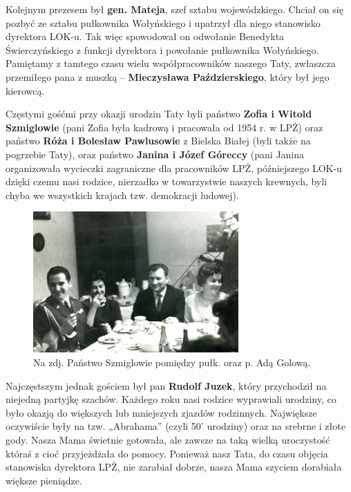 Kolejnym prezesem był \textbf{gen. Mateja}, szef sztabu wojewódzkiego. Chciał on się pozbyć ze sztabu pułkownika Wołyńskiego i upatrzył dla niego stanowisko dyrektora LOK-u. Tak więc spowodował on odwołanie Benedykta Świerczyńskiego z funkcji dyrektora i powołanie pułkownika Wołyńskiego. Pamiętamy z tamtego czasu wielu współpracowników naszego Taty, zwłaszcza przemiłego pana z muszką – \textbf{Mieczysława Paździerskiego}, który był jego kierowcą.

Częstymi gośćmi przy okazji urodzin Taty byli państwo \textbf{Zofia i Witold Szmiglowie} (pani Zofia była kadrową i pracowała od 1954 r. w LPŻ) oraz państwo \textbf{Róża i Bolesław Pawlusowie} z Bielska Białej (byli także na pogrzebie Taty), oraz państwo \textbf{Janina i Józef Góreccy} (pani Janina organizowała wycieczki zagraniczne dla pracowników LPŻ, późniejszego LOK-u dzięki czemu nasi rodzice, nierzadko  w towarzystwie naszych krewnych, byli chyba we wszystkich krajach tzw. demokracji ludowej).
\begin{figure}[!h]
\begin{center}
\includegraphics[width=0.7\textwidth]{photo/szmiglowie.jpg}
\caption[Państwo Szmiglowie]{Na zdj. Państwo Szmiglowie pomiędzy pułk. oraz p. Adą Golową.}
\end{center}
\end{figure}

Najczęstszym jednak gościem był pan \textbf{Rudolf Juzek}, który przychodził na niejedną partyjkę szachów. Każdego roku nasi rodzice wyprawiali urodziny, co było okazją do większych lub mniejszych zjazdów rodzinnych. Największe oczywiście były na tzw. „Abrahama” (czyli 50’ urodziny) oraz na srebrne i złote gody. Nasza Mama świetnie gotowała, ale zawsze na taką wielką uroczystość któraś z cioć przyjeżdżała do pomocy. Ponieważ nasz Tata, do czasu objęcia stanowiska dyrektora LPŻ, nie zarabiał dobrze, nasza Mama szyciem dorabiała większe pieniądze. 














